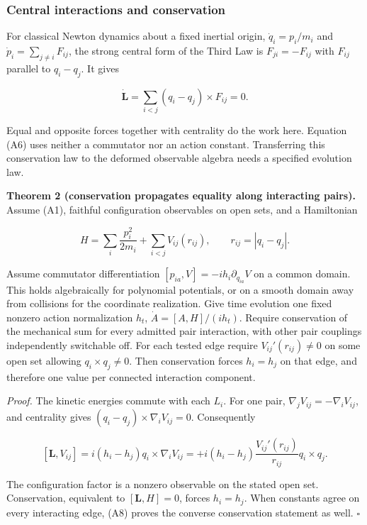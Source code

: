 \documentclass[11pt,a4paper]{article}
\begin{document}
\hypertarget{central-interactions-and-conservation}{%
\subsubsection{Central interactions and
conservation}\label{central-interactions-and-conservation}}

For classical Newton dynamics about a fixed inertial origin,
\(\dot q_i=p_i/m_i\) and \(\dot p_i=\sum_{j\ne i}F_{ij}\), the strong
central form of the Third Law is \(F_{ji}=-F_{ij}\) with \(F_{ij}\)
parallel to \(q_i-q_j\). It gives

\[
\dot{\mathbf L}
=\sum_{i<j}(q_i-q_j)\times F_{ij}=0. \tag{A6}
\]

Equal and opposite forces together with centrality do the work here.
Equation (A6) uses neither a commutator nor an action constant.
Transferring this conservation law to the deformed observable algebra
needs a specified evolution law.

\textbf{Theorem 2 (conservation propagates equality along interacting
pairs).} Assume (A1), faithful configuration observables on open sets,
and a Hamiltonian

\[
H=\sum_i\frac{p_i^2}{2m_i}+\sum_{i<j}V_{ij}(r_{ij}),\qquad
r_{ij}=|q_i-q_j|. \tag{A7}
\]

Assume commutator differentiation \([p_{ia},V]=-ih_i\partial_{q_{ia}}V\)
on a common domain. This holds algebraically for polynomial potentials,
or on a smooth domain away from collisions for the coordinate
realization. Give time evolution one fixed nonzero action normalization
\(h_t\), \(\dot A=[A,H]/(ih_t)\). Require conservation of the mechanical
sum for every admitted pair interaction, with other pair couplings
independently switchable off. For each tested edge require
\(V_{ij}'(r_{ij})\ne0\) on some open set allowing \(q_i\times q_j\ne0\).
Then conservation forces \(h_i=h_j\) on that edge, and therefore one
value per connected interaction component.

\emph{Proof.} The kinetic energies commute with each \(L_i\). For one
pair, \(\nabla_j V_{ij}=-\nabla_i V_{ij}\), and centrality gives
\((q_i-q_j)\times\nabla_i V_{ij}=0\). Consequently

\[
[\mathbf L,V_{ij}]
=i(h_i-h_j)q_i\times\nabla_i V_{ij}
=+i(h_i-h_j)\frac{V_{ij}'(r_{ij})}{r_{ij}}q_i\times q_j. \tag{A8}
\]

The configuration factor is a nonzero observable on the stated open set.
Conservation, equivalent to \([\mathbf L,H]=0\), forces \(h_i=h_j\).
When constants agree on every interacting edge, (A8) proves the converse
conservation statement as well. \(\square\)
\end{document}
